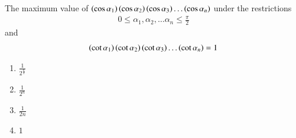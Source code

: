     \item The maximum value of $\left(\cos{\alpha_1}\right)\left(\cos{\alpha_2}\right)\left(\cos{\alpha_3}\right)\dots\left(\cos{\alpha_n}\right)$ under the restrictions
   	\begin{align*} 
		0\le\alpha_1,\alpha_2,\dots\alpha_n\le\frac{\pi}{2}
	\end {align*} and 
	\begin{align*}
		\left(\cot{\alpha_1}\right)\left(\cot{\alpha_2}\right)\left(\cot{\alpha_3}\right)\dots\left(\cot{\alpha_n}\right) = 1
	\end{align*}
        \hfill{}
        \begin{enumerate}
                \item $\frac{1}{2^{\frac{n}{2}}}$
                \item $\frac{1}{2^{n}}$
                \item $\frac{1}{2n}$
                \item $1$
        \end{enumerate}
